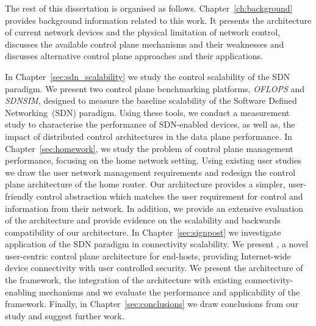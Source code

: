 The rest of this dissertation is organised as follows.
Chapter~\ref{ch:background} provides background information related to this
work. It presents the architecture of current network devices and the physical
limitation of network control, discusses the available control plane mechanisms
and their weaknesses and discusses alternative control plane approaches and
their applications.  

In Chapter~\ref{sec:sdn_scalability} we study the control scalability of the SDN
paradigm.  We present two control plane benchmarking platforms, {\it OFLOPS}
\/and {\it SDNSIM}, designed to measure the baseline scalability of the Software
Defined Networking~(SDN) paradigm. Using these tools, we conduct a measurement
study to characterise the performance of SDN-enabled devices, as well as, the
impact of distributed control architectures in the data plane performance.  In
Chapter~\ref{sec:homework}, we study the problem of control plane management
performance, focusing on the home network setting. Using existing user studies
we draw the user network management requirements and redesign the control plane
architecture of the home router. Our architecture provides a simpler,
user-friendly control abstraction which matches the user requirement for control
and information from their network. In addition, we provide an extensive
evaluation of the architecture and provide evidence on the scalability and
backwards compatibility of our architecture.  In Chapter~\ref{sec:signpost} we
investigate application of the SDN paradigm in connectivity scalability. We
present \signpost, a novel user-centric control plane architecture for
end-hosts, providing Internet-wide device connectivity with user controlled
security. We present the architecture of the framework, the integration of the
architecture with existing connectivity-enabling mechanisms and we evaluate the
performance and applicability of the framework.  Finally, in
Chapter~\ref{sec:conclusions} we draw conclusions from our study and suggest
further work. 

